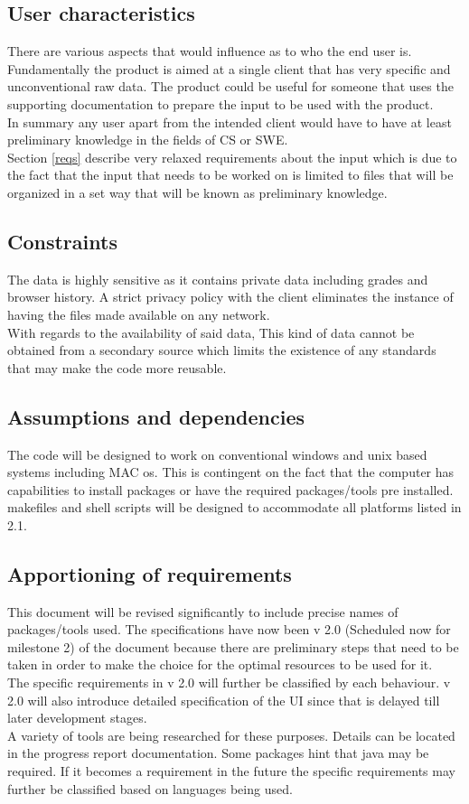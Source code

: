 \documentclass[12pt]{article}
\begin{document}
	\subsection{User characteristics}
	There are various aspects that would influence as to who the end user is. Fundamentally the product is aimed at a single client that has very specific and unconventional raw data. The product could be useful for someone that uses the supporting documentation to prepare the input to be used with the product. \\
	In summary any user apart from the intended client would have to have at least preliminary knowledge in the fields of CS or SWE. \\ 
	Section \ref{reqs} describe very relaxed requirements about the input which is due to the fact that the input that needs to be worked on is limited to files that will be organized in a set way that will be known as preliminary knowledge.
	\subsection{Constraints}
	The data is highly sensitive as it contains private data including grades and browser history. A strict privacy policy with the client eliminates the instance of having the files made available on any network. \\
	With regards to the availability of said data, This kind of data cannot be obtained from a secondary source which limits the existence of any standards that may make the code more reusable.
	\subsection{Assumptions and dependencies}
	The code will be designed to work on conventional windows and unix based systems including MAC os. This is contingent on the fact that the computer has capabilities to install packages or have the required packages/tools pre installed. \\
	makefiles and shell scripts will be designed to accommodate all platforms listed in 2.1.
	\subsection{Apportioning of requirements}
	This document will be revised significantly to include precise names of packages/tools used. The specifications have now been v 2.0 (Scheduled now for milestone 2) of the document because there are preliminary steps that need to be taken in order to make the choice for the optimal resources to be used for it.\\ 
	The specific requirements in v 2.0 will further be classified by each behaviour. v 2.0 will also introduce detailed specification of the UI since that is delayed till later development stages. \\
	A variety of tools are being researched for these purposes. Details can be located in the progress report documentation. Some packages hint that java may be required. If it becomes a requirement in the future the specific requirements may further be classified based on languages being used. 
	\pagebreak
\end{document}
